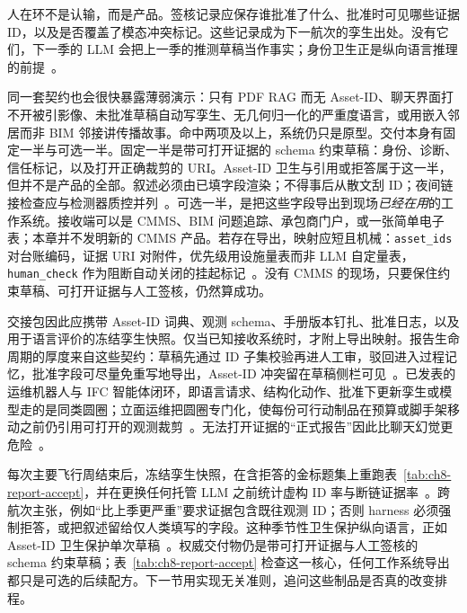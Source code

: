 人在环不是认输，而是产品。签核记录应保存谁批准了什么、批准时可见哪些证据 ID，以及是否覆盖了模态冲突标记。这些记录成为下一航次的孪生出处。没有它们，下一季的 LLM 会把上一季的推测草稿当作事实；身份卫生正是纵向语言推理的前提~\cite{zhang2025}。

同一套契约也会很快暴露薄弱演示：只有 PDF RAG 而无 Asset-ID、聊天界面打不开被引影像、未批准草稿自动写孪生、无几何归一化的严重度语言，或用嵌入邻居而非 BIM 邻接讲传播故事。命中两项及以上，系统仍只是原型。交付本身有固定一半与可选一半。固定一半是带可打开证据的 schema 约束草稿：身份、诊断、信任标记，以及打开正确裁剪的 URI。Asset-ID 卫生与引用或拒答属于这一半，但并不是产品的全部。叙述必须由已填字段渲染；不得事后从散文刮 ID；夜间链接检查应与检测器质控并列~\cite{zheng2023bimassistant,joffe2025buildingcodes,zhang2025,gao2026ifcagent}。可选一半，是把这些字段导出到现场\emph{已经在用}的工作系统。接收端可以是 CMMS、BIM 问题追踪、承包商门户，或一张简单电子表；本章并不发明新的 CMMS 产品。若存在导出，映射应短且机械：\texttt{asset\_ids} 对台账编码，证据 URI 对附件，优先级用设施量表而非 LLM 自定量表，\texttt{human\_check} 作为阻断自动关闭的挂起标记~\cite{chen2023facility,krutli2025fmrags,buga2025llmfmsql}。没有 CMMS 的现场，只要保住约束草稿、可打开证据与人工签核，仍然算成功。

交接包因此应携带 Asset-ID 词典、观测 schema、手册版本钉扎、批准日志，以及用于语言评价的冻结孪生快照。仅当已知接收系统时，才附上导出映射。报告生命周期的厚度来自这些契约：草稿先通过 ID 子集校验再进人工审，驳回进入过程记忆，批准字段可尽量免重写地导出，Asset-ID 冲突留在草稿侧栏可见~\cite{buga2025llmfmsql,chen2023facility,quan2026bimfacrag,hellin2025bimmas}。已发表的运维机器人与 IFC 智能体闭环，即语言请求、结构化动作、批准下更新孪生或模型走的是同类圆圈；立面运维把圆圈专门化，使每份可行动制品在预算或脚手架移动之前仍引用可打开的观测裁剪~\cite{luo2025llmdtrobot,gao2026ifcagent,saka2024gptconstruction}。无法打开证据的``正式报告''因此比聊天幻觉更危险~\cite{ji2023}。

每次主要飞行周结束后，冻结孪生快照，在含拒答的金标题集上重跑表~\ref{tab:ch8-report-accept}，并在更换任何托管 LLM 之前统计虚构 ID 率与断链证据率~\cite{liang2023helm,zhang2025}。跨航次主张，例如``比上季更严重''要求证据包含既往观测 ID；否则 harness 必须强制拒答，或把叙述留给仅人类填写的字段。这种季节性卫生保护纵向语言，正如 Asset-ID 卫生保护单次草稿~\cite{chen2023facility,krutli2025fmrags}。权威交付物仍是带可打开证据与人工签核的 schema 约束草稿；表~\ref{tab:ch8-report-accept} 检查这一核心，任何工作系统导出都只是可选的后续配方。下一节用实现无关准则，追问这些制品是否真的改变排程。

